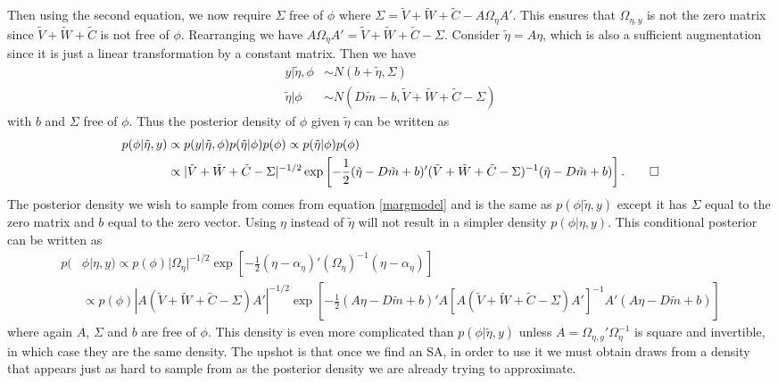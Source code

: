 \documentclass[12pt]{article}
\begin{document}
Then using the second equation, we now require $\Sigma$ free of $\phi$ where $\Sigma = \tilde{V} + \tilde{W} + \tilde{C} - A\Omega_{\eta}A'$. This ensures that $\Omega_{\eta,y}$ is not the zero matrix since $\tilde{V} + \tilde{W} + \tilde{C}$ is not free of $\phi$. Rearranging we have $A\Omega_{\eta}A' = \tilde{V} + \tilde{W} + \tilde{C} - \Sigma$. Consider $\tilde{\eta}=A\eta$, which is also a sufficient augmentation since it is just a linear transformation by a constant matrix. Then we have
\begin{align*}
y|\tilde{\eta},\phi & \sim N(b + \tilde{\eta}, \Sigma)\\
\tilde{\eta}|\phi & \sim N(D\tilde{m} - b, \tilde{V} + \tilde{W} + \tilde{C} - \Sigma)
\end{align*}
with $b$ and $\Sigma$ free of $\phi$. Thus the posterior density of $\phi$ given $\tilde{\eta}$ can be written as
\begin{align*}
  p(\phi|\tilde{\eta}, y) &\propto p(y|\tilde{\eta},\phi)p(\tilde{\eta}|\phi)p(\phi) \propto p(\tilde{\eta}|\phi)p(\phi) \\
&\propto |\tilde{V} + \tilde{W} + \tilde{C} - \Sigma|^{-1/2}\exp\left[-\frac{1}{2}(\tilde{\eta} - D\tilde{m} + b)'(\tilde{V} + \tilde{W} + \tilde{C} - \Sigma)^{-1}(\tilde{\eta} - D\tilde{m} + b)\right]. \qed
\end{align*}
The posterior density we wish to sample from comes from equation \eqref{margmodel} and is the same as $p(\phi|\tilde{\eta},y)$ except it has $\Sigma$ equal to the zero matrix and $b$ equal to the zero vector. Using $\eta$ instead of $\tilde{\eta}$ will not result in a simpler density $p(\phi|\eta,y)$. This conditional posterior can be written as
\begin{align*}
p(&\phi|\eta,y) \propto p(\phi) |\Omega_{\eta}|^{-1/2}\exp\left[-\frac{1}{2}(\eta - \alpha_{\eta})'(\Omega_{\eta})^{-1}(\eta - \alpha_{\eta})\right]\\
 &\propto p(\phi) |A(\tilde{V} + \tilde{W} + \tilde{C} - \Sigma)A'|^{-1/2}\exp\left[-\frac{1}{2}(A\eta - D\tilde{m} + b)'A[A(\tilde{V} + \tilde{W} + \tilde{C} - \Sigma)A']^{-1}A'(A\eta - D\tilde{m} + b)\right]
\end{align*}
where again $A$, $\Sigma$ and $b$ are free of $\phi$. This density is even more complicated than $p(\phi|\tilde{\eta},y)$ unless $A=\Omega_{\eta,y}'\Omega_\eta^{-1}$ is square and invertible, in which case they are the same density. The upshot is that once we find an SA, in order to use it we must obtain draws from a density that appears just as hard to sample from as the posterior density we are already trying to approximate.
\end{document}
